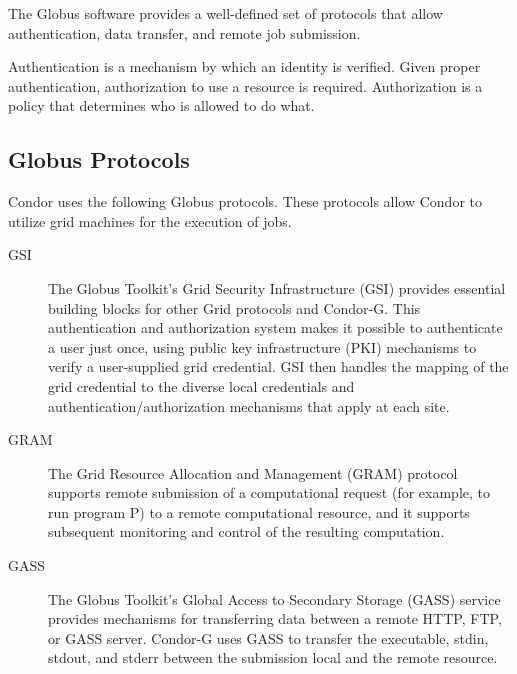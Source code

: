 The Globus software provides a well-defined set of protocols
that allow authentication, data transfer, and remote job submission.

Authentication is a mechanism by which an identity is verified.
Given proper authentication, authorization to use a resource
is required.
Authorization is a policy that determines who is allowed to do what. 


\subsection{\label{sec:Globus-Protocols}Globus Protocols}
Condor uses the following Globus protocols.
These protocols allow Condor to utilize grid machines for
the execution of jobs.
\begin{description}
\item[GSI]
The Globus Toolkit's Grid Security Infrastructure (GSI) provides essential
building blocks for other Grid protocols and Condor-G.
This authentication and authorization system
makes it possible to authenticate a user just once,
using public key infrastructure (PKI) mechanisms to verify
a user-supplied grid credential.
GSI then handles the mapping of the grid credential to the
diverse local credentials and authentication/authorization mechanisms that
apply at each site. 
\item[GRAM]
The Grid Resource Allocation and Management (GRAM) protocol supports remote
submission of a computational request (for example, to run program P)
to a remote computational resource,
and it supports subsequent monitoring and control of the resulting
computation. 
\item[GASS]
The Globus Toolkit's Global Access to Secondary Storage (GASS) service provides
mechanisms for transferring data between a remote HTTP, FTP, or GASS server. 
Condor-G uses GASS to transfer the executable, stdin, stdout, and stderr
between the submission local and the remote resource.
\end{description}

